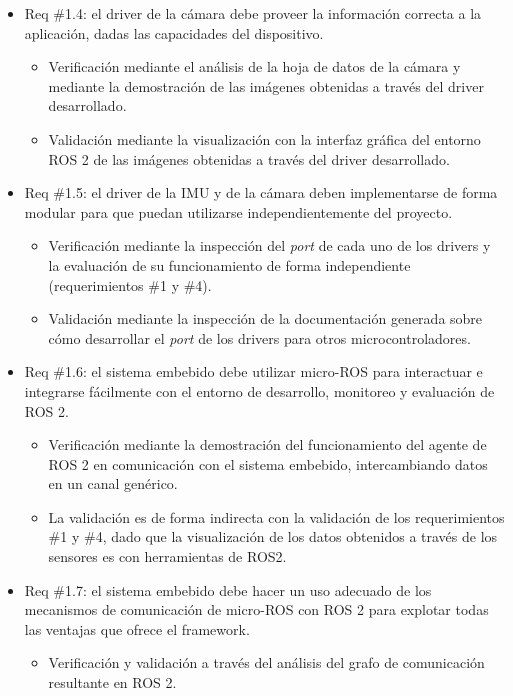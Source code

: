 \documentclass[
11pt, %
codirector, %
]{charter}
\begin{document}
\begin{itemize}
\begin{itemize}
	\end{itemize}
	\item Req \#1.4: el driver de la cámara debe proveer la información correcta a la aplicación, dadas las capacidades del dispositivo.
	\begin{itemize}
		\item Verificación mediante el análisis de la hoja de datos de la cámara y mediante la demostración de las imágenes obtenidas a través del driver desarrollado.
		\item Validación mediante la visualización con la interfaz gráfica del entorno ROS 2 de las imágenes obtenidas a través del driver desarrollado.
	\end{itemize}
	\item Req \#1.5: el driver de la IMU y de la cámara deben implementarse de forma modular para que puedan utilizarse independientemente del proyecto.
	\begin{itemize}
		\item Verificación mediante la inspección del \textit{port} de cada uno de los drivers y la evaluación de su funcionamiento de forma independiente (requerimientos \#1 y \#4).
		\item Validación mediante la inspección de la documentación generada sobre cómo desarrollar el \textit{port} de los drivers para otros microcontroladores.
	\end{itemize}
	\item Req \#1.6: el sistema embebido debe utilizar micro-ROS para interactuar e integrarse fácilmente con el entorno de desarrollo, monitoreo y evaluación de ROS 2.
	\begin{itemize}
		\item Verificación mediante la demostración del funcionamiento del agente de ROS 2 en comunicación con el sistema embebido, intercambiando datos en un canal genérico.
		\item La validación es de forma indirecta con la validación de los requerimientos \#1 y \#4, dado que la visualización de los datos obtenidos a través de los sensores es con herramientas de ROS2.
	\end{itemize}
	\item Req \#1.7: el sistema embebido debe hacer un uso adecuado de los mecanismos de comunicación de micro-ROS con ROS 2 para explotar todas las ventajas que ofrece el framework.
	\begin{itemize}
		\item Verificación y validación a través del análisis del grafo de comunicación resultante en ROS 2.

\end{itemize}
\end{itemize}
\end{document}
